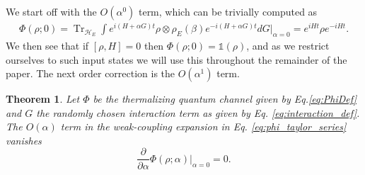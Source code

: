 \documentclass{article}
\newtheorem{theorem}{Theorem}
\newcommand{\bigo}[1]{O\left(#1\right)}
\DeclareMathOperator{\Tr}{Tr}
\newcommand{\hilb}{\mathcal{H}}
\newcommand{\identity}{\mathds{1}}
\begin{document}
We start off with the $\bigo{\alpha^0}$ term, which can be trivially computed as
\begin{align}
\Phi(\rho; 0) = \Tr_{\hilb_E}\int e^{i(H + \alpha G) t} \rho \otimes \rho_E(\beta) e^{-i (H + \alpha G) t} dG \bigg|_{\alpha = 0} = e^{i H t} \rho e^{-i H t}.
\end{align}
We then see that if $[ \rho, H] = 0$ then $\Phi(\rho; 0) = \identity(\rho)$, and as we restrict ourselves to such input states we will use this throughout the remainder of the paper. The next order correction is the $\bigo{\alpha^1}$ term. 
\begin{theorem} \label{lem:first_order_phi}
Let $\Phi$ be the thermalizing quantum channel given by Eq.\eqref{eq:PhiDef} and $G$ the randomly chosen interaction term as given by Eq. \eqref{eq:interaction_def}. The $O(\alpha)$ term in the weak-coupling expansion in Eq. \eqref{eq:phi_taylor_series} vanishes
   \begin{equation}
        \frac{\partial}{\partial \alpha} \Phi(\rho; \alpha) \big|_{\alpha = 0} = 0.
   \end{equation}
\end{theorem}
\end{document}

